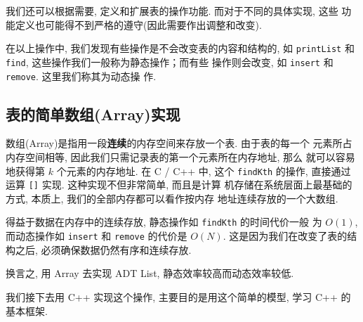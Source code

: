 \documentclass[a4paper]{ctexart}
\theoremstyle{definition}
\theoremstyle{definition}
\begin{document}
我们还可以根据需要, 定义和扩展表的操作功能. 而对于不同的具体实现, 这些
功能定义也可能得不到严格的遵守(因此需要作出调整和改变).

在以上操作中, 我们发现有些操作是不会改变表的内容和结构的, 如
\verb|printList| 和 \verb|find|, 这些操作我们一般称为静态操作；而有些
操作则会改变, 如 \verb|insert| 和 \verb|remove|. 这里我们称其为动态操
作.

\subsection{表的简单数组(Array)实现}
数组(Array)是指用一段{\bf 连续}的内存空间来存放一个表. 由于表的每一个
元素所占内存空间相等, 因此我们只需记录表的第一个元素所在内存地址, 那么
就可以容易地获得第 $k$ 个元素的内存地址. 在 C / C++ 中, 这个 \verb|findKth|
的操作, 直接通过运算 \verb|[]| 实现. 这种实现不但非常简单, 而且是计算
机存储在系统层面上最基础的方式, 本质上, 我们的全部内存都可以看作按内存
地址连续存放的一个大数组.

得益于数据在内存中的连续存放, 静态操作如 \verb|findKth| 的时间代价一般
为 $O(1)$, 而动态操作如 \verb|insert| 和 \verb|remove| 的代价是
$O(N)$. 这是因为我们在改变了表的结构之后, 必须确保数据仍然有序和连续存放. 

换言之, 用 Array 去实现 ADT List, 静态效率较高而动态效率较低. 

我们接下去用 C++ 实现这个操作, 主要目的是用这个简单的模型, 学习 C++ 的
基本框架.


\end{document}
